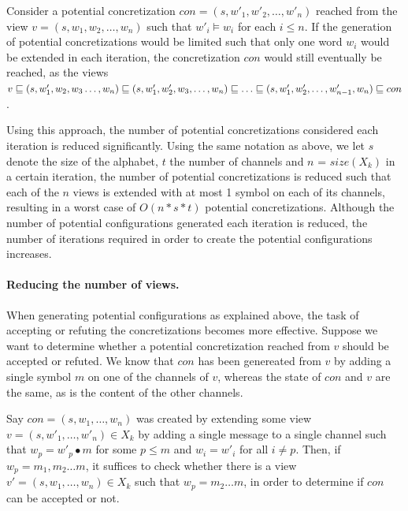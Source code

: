 Consider a potential concretization $con = (s, w'_1, w'_2, \ldots, w'_n)$ reached from the view $v = (s, w_1, w_2, \ldots, w_n)$ such that $w'_i \models w_i$ for each $i \leq n$. If the generation of potential concretizations would be limited such that only one word $w_i$ would be extended in each iteration, the concretization $con$ would still eventually be reached, as the views $v \sqsubseteq (s, w'_1, w_2, w_3 \ldots, w_n) \sqsubseteq (s, w'_1, w'_2, w_3, \ldots, w_n) \sqsubseteq \ldots \sqsubseteq (s, w'_1, w'_2, \ldots, w'_{n-1}, w_n) \sqsubseteq con$.

Using this approach, the number of potential concretizations considered each iteration is reduced significantly. Using the same notation as above, we let $s$ denote the size of the alphabet, $t$ the number of channels and $n$ = $size(X_k)$ in a certain iteration, the number of potential concretizations is reduced such that each of the $n$ views is extended with at most 1 symbol on each of its channels, resulting in a worst case of $O(n*s*t)$ potential concretizations. Although the number of potential configurations generated each iteration is reduced, the number of iterations required in order to create the potential configurations increases.

\paragraph{Reducing the number of views.}
When generating potential configurations as explained above, the task of accepting or refuting the concretizations becomes more effective.  
Suppose we want to determine whether a potential concretization  reached from $v$ should be accepted or refuted. We know that $con$ has been genereated from $v$ by adding a single symbol $m$ on one of the channels of $v$, whereas the state of $con$ and $v$ are the same, as is the content of the other channels.

\begin{lemma}
Say $con = (s, w_1, \ldots, w_n)$ was created by extending some view $v = (s, w'_1, \ldots, w'_n) \in X_k$ by adding a single message to a single channel such that $w_p = w'_p \bullet m$ for some $p\leq m$ and $w_i = w'_i$ for all $i \neq p$. Then, if $w_p = m_1, m_2 \ldots m$, it suffices to check whether there is a view $v' = (s, w_1, \ldots, w_n) \in X_k$ such that $w_p = m_2\ldots m$, in order to determine if $con$ can be accepted or not.
\end{lemma}

